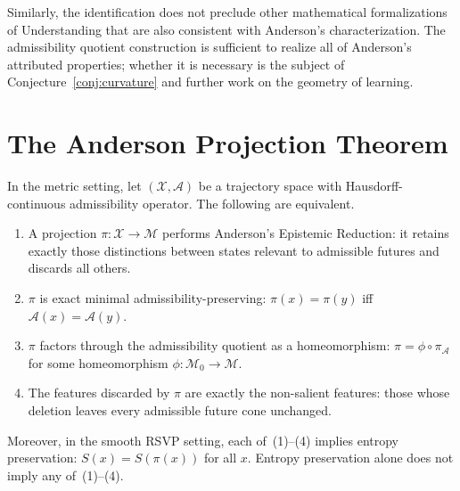 \documentclass[12pt, a4paper, oneside]{book}
\newcommand{\Adm}{\mathcal{A}}
\newcommand{\X}{\mathcal{X}}
\newcommand{\M}{\mathcal{M}}
\newcommand{\proj}{\pi}
\newcommand{\projA}{\pi_{\!\Adm}}
\newcommand{\Ent}{S}
\begin{document}
Similarly, the identification does not preclude other mathematical
formalizations of Understanding that are also consistent with Anderson's
characterization. The admissibility quotient construction is sufficient
to realize all of Anderson's attributed properties; whether it is
necessary is the subject of Conjecture~\ref{conj:curvature} and further
work on the geometry of learning.

\chapter{The Anderson Projection Theorem}
\label{ch:andersonthm}

\begin{theorem}
\label{thm:anderson}
In the metric setting, let $(\X, \Adm)$ be a trajectory space with
Hausdorff-continuous admissibility operator. The following are equivalent.
\begin{enumerate}
  \item A projection $\proj : \X \to \M$ performs Anderson's Epistemic
    Reduction: it retains exactly those distinctions between states
    relevant to admissible futures and discards all others.
  \item $\proj$ is exact minimal admissibility-preserving:
    $\proj(x) = \proj(y)$ iff $\Adm(x) = \Adm(y)$.
  \item $\proj$ factors through the admissibility quotient as a
    homeomorphism: $\proj = \phi \circ \projA$ for some homeomorphism
    $\phi : \M_0 \to \M$.
  \item The features discarded by $\proj$ are exactly the non-salient
    features: those whose deletion leaves every admissible future cone
    unchanged.
\end{enumerate}
Moreover, in the smooth RSVP setting, each of~(1)--(4) implies
entropy preservation: $\Ent(x) = \Ent(\proj(x))$ for all $x$.
Entropy preservation alone does not imply any of~(1)--(4).
\end{theorem}
\end{document}
